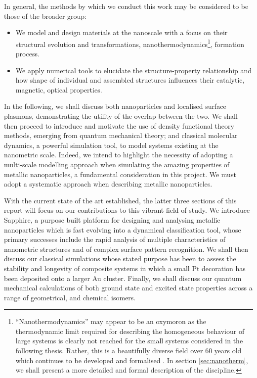 In general, the methods by which we conduct this work may be considered to be those of the broader group:

\begin{itemize}
    \item We model and design materials at the nanoscale with a focus on their structural evolution and transformations, nanothermodynamics\footnote{``Nanothermodynamics'' may appear to be an oxymoron as the thermodynamic limit required for describing the homogeneous behaviour of large systems is clearly not reached for the small systems considered in the following thesis. Rather, this is a beautifully diverse field over 60 years old \cite{10.1063/1.1732447} which continues to be developed and formalised \cite{e17010052,C4SC00052H}. In section \ref{sec:nanotherm}, we shall present a more detailed and formal description of the discipline.}, formation process.

    \item We apply numerical tools to elucidate the structure-property relationship and how shape of individual and assembled structures influences their catalytic, magnetic, optical properties.
\end{itemize}


In the following, we shall discuss both nanoparticles and localised surface plasmons, demonstrating the utility of the overlap between the two. We shall then proceed to introduce and motivate the use of density functional theory methods, emerging from quantum mechanical theory; and classical molecular dynamics, a powerful simulation tool, to model systems existing at the nanometric scale. Indeed, we intend to highlight the necessity of adopting a multi-scale modelling approach when  simulating the amazing properties of metallic nanoparticles, a fundamental consideration in this project. We must adopt a systematic approach when describing metallic nanoparticles. 

With the current state of the art established, the latter three sections of this report will focus on our contributions to this vibrant field of study. We introduce Sapphire, a purpose built platform for designing and analysing metallic nanoparticles which is fast evolving into a dynamical classification tool, whose primary successes include the rapid analysis of multiple characteristics of nanometric structures and of complex surface pattern recognition. We shall then discuss our classical simulations whose stated purpose has been to assess the stability and longevity of composite systems in which a small Pt decoration has been deposited onto a larger Au cluster. Finally, we shall discuss our quantum mechanical calculations of both ground state and excited state properties across a range of geometrical, and chemical isomers. 

